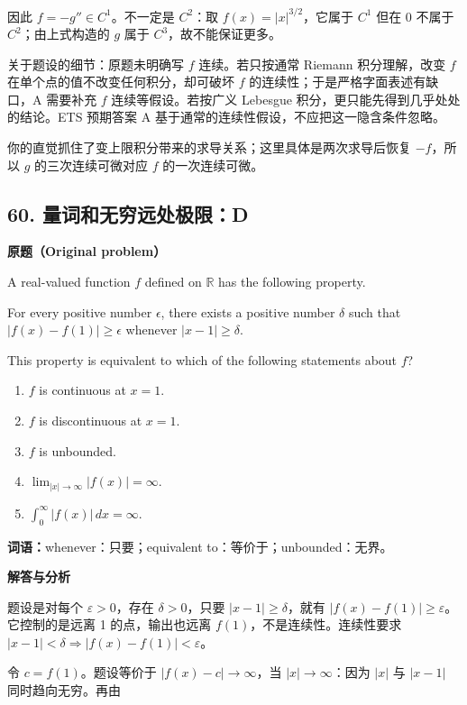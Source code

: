 \documentclass[11pt,a4paper]{ctexart}
\begin{document}
因此 \(f=-g''\in C^1\)。不一定是 \(C^2\)：取 \(f(x)=|x|^{3/2}\)，它属于
\(C^1\) 但在 0 不属于 \(C^2\)；由上式构造的 \(g\) 属于
\(C^3\)，故不能保证更多。

关于题设的细节：原题未明确写 \(f\) 连续。若只按通常 Riemann
积分理解，改变 \(f\) 在单个点的值不改变任何积分，却可破坏 \(f\)
的连续性；于是严格字面表述有缺口，A 需要补充 \(f\) 连续等假设。若按广义
Lebesgue 积分，更只能先得到几乎处处的结论。ETS 预期答案 A
基于通常的连续性假设，不应把这一隐含条件忽略。

你的直觉抓住了变上限积分带来的求导关系；这里具体是两次求导后恢复
\(-f\)，所以 \(g\) 的三次连续可微对应 \(f\) 的一次连续可微。

\hypertarget{ux91cfux8bcdux548cux65e0ux7a77ux8fdcux5904ux6781ux9650d}{%
\subsection{60.
量词和无穷远处极限：D}\label{ux91cfux8bcdux548cux65e0ux7a77ux8fdcux5904ux6781ux9650d}}

\textbf{原题（Original problem）}\par
A real-valued function $f$ defined on $\mathbb R$ has the following property.

For every positive number $\epsilon$, there exists a positive number $\delta$ such that $|f(x)-f(1)|\ge\epsilon$ whenever $|x-1|\ge\delta$.

This property is equivalent to which of the following statements about $f$?
\begin{enumerate}[label=(\Alph*)]
\item $f$ is continuous at $x=1$. \item $f$ is discontinuous at $x=1$. \item $f$ is unbounded. \item $\displaystyle\lim_{|x|\to\infty}|f(x)|=\infty$. \item $\displaystyle\int_0^\infty |f(x)|\,dx=\infty$.
\end{enumerate}
\textbf{词语：}whenever：只要；equivalent to：等价于；unbounded：无界。

\textbf{解答与分析}\par


题设是对每个 \(\varepsilon>0\)，存在 \(\delta>0\)，只要
\textbf{\(|x-1|\ge\delta\)}，就有
\textbf{\(|f(x)-f(1)|\ge\varepsilon\)}。它控制的是远离 1
的点，输出也远离 \(f(1)\)，不是连续性。连续性要求
\(|x-1|<\delta\Rightarrow|f(x)-f(1)|<\varepsilon\)。

令 \(c=f(1)\)。题设等价于 \(|f(x)-c|\to\infty\)，当
\(|x|\to\infty\)：因为 \(|x|\) 与 \(|x-1|\) 同时趋向无穷。再由
\end{document}
